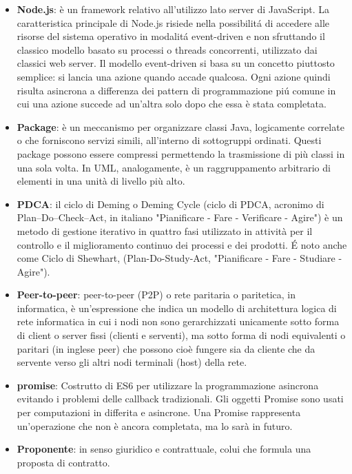 \begin{itemize}
\item[] \textbf{Node.js}: è un framework relativo all'utilizzo lato server di JavaScript. La caratteristica principale di Node.js risiede nella possibilit\'a di accedere alle risorse del sistema operativo in modalit\'a event-driven e non sfruttando il classico modello basato su processi o threads concorrenti, utilizzato dai classici web server. Il modello event-driven si basa su un concetto piuttosto semplice: si lancia una azione quando accade qualcosa. Ogni azione quindi risulta asincrona a differenza dei pattern di programmazione pi\'u comune in cui una azione succede ad un'altra solo dopo che essa è stata completata.
\end{itemize}
\newpage

\begin{itemize}
\item[] \textbf{Package}: è un meccanismo per organizzare classi Java, logicamente correlate o che forniscono servizi simili, all'interno di sottogruppi ordinati. Questi package possono essere compressi permettendo la trasmissione di più classi in una sola volta. In UML, analogamente, è un raggruppamento arbitrario di elementi in una unità di livello più alto.
\item[] \textbf{PDCA}: il ciclo di Deming o Deming Cycle (ciclo di PDCA, acronimo di Plan–Do–Check–Act, in italiano "Pianificare - Fare - Verificare - Agire") è un metodo di gestione iterativo in quattro fasi utilizzato in attività per il controllo e il miglioramento continuo dei processi e dei prodotti. \'E noto anche come Ciclo di Shewhart, (Plan-Do-Study-Act, "Pianificare - Fare - Studiare - Agire").
\item[] \textbf{Peer-to-peer}: peer-to-peer (P2P) o rete paritaria o paritetica, in informatica, è un'espressione che indica un modello di architettura logica di rete informatica in cui i nodi non sono gerarchizzati unicamente sotto forma di client o server fissi (clienti e serventi), ma sotto forma di nodi equivalenti o paritari (in inglese peer) che possono cioè fungere sia da cliente che da servente verso gli altri nodi terminali (host) della rete.
\item[] \textbf{promise}: Costrutto di ES6 per utilizzare la programmazione asincrona evitando i problemi delle callback tradizionali. Gli oggetti Promise sono usati per computazioni in differita e asincrone. Una Promise rappresenta un'operazione che non è ancora completata, ma lo sarà in futuro.
\item[] \textbf{Proponente}: in senso giuridico e contrattuale, colui che formula una proposta di contratto.
\end{itemize}
\newpage

